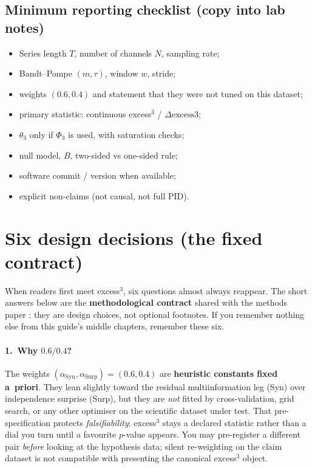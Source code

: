 \documentclass[11pt,a4paper]{article}
\begin{document}
\subsection{Minimum reporting checklist (copy into lab notes)}

\begin{itemize}[leftmargin=*,itemsep=2pt]
  \item Series length $T$, number of channels $N$, sampling rate;
  \item Bandt--Pompe $(m,\tau)$, window $w$, stride;
  \item weights $(0.6,0.4)$ and statement that they were not tuned on this
  dataset;
  \item primary statistic: continuous excess$^3$ / $\Delta\mathrm{excess3}$;
  \item $\theta_3$ only if $\Phi_3$ is used, with saturation checks;
  \item null model, $B$, two-sided vs one-sided rule;
  \item software commit / version when available;
  \item explicit non-claims (not causal, not full PID).
\end{itemize}

\section{Six design decisions (the fixed contract)}
\label{sec:design}

When readers first meet excess$^3$, six questions almost always reappear.
The short answers below are the \textbf{methodological contract} shared with
the methods paper \citep{Padilla2026excess3}: they are design choices, not
optional footnotes. If you remember nothing else from this guide's middle
chapters, remember these six.

\paragraph{1.\ Why $0.6/0.4$?}
The weights
$(\alpha_{\mathrm{Syn}},\alpha_{\mathrm{Surp}})=(0.6,0.4)$ are
\textbf{heuristic constants fixed a~priori}. They lean slightly toward the
residual multiinformation leg (Syn) over independence surprise (Surp), but
they are \emph{not} fitted by cross-validation, grid search, or any other
optimiser on the scientific dataset under test. That pre-specification
protects \emph{falsifiability}: excess$^3$ stays a declared statistic rather
than a dial you turn until a favourite $p$-value appears. You may pre-register
a different pair \emph{before} looking at the hypothesis data; silent
re-weighting on the claim dataset is not compatible with presenting the
canonical excess$^3$ object.
\end{document}
